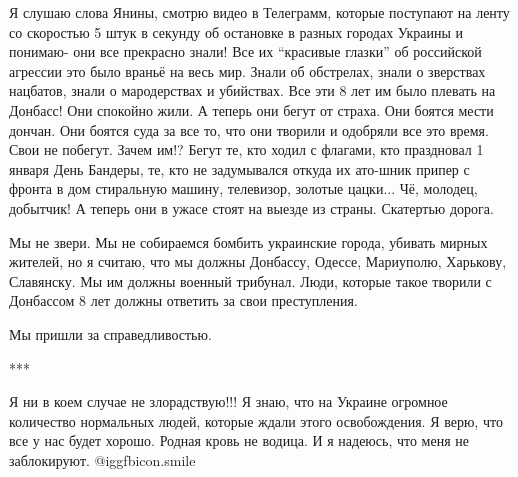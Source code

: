 Я слушаю слова Янины, смотрю видео в Телеграмм, которые поступают на ленту со
скоростью 5 штук в секунду об остановке в разных городах Украины и понимаю- они
все прекрасно знали! Все их \enquote{красивые глазки} об российской агрессии это было
враньё на весь мир. Знали об обстрелах, знали о зверствах нацбатов, знали о
мародерствах и убийствах. Все эти 8 лет им было плевать на Донбасс! Они
спокойно жили. А теперь они бегут от страха. Они боятся мести дончан. Они
боятся суда за все то, что они творили и одобряли все это время. Свои не
побегут. Зачем им!? Бегут те, кто ходил с флагами, кто праздновал 1 января День
Бандеры, те, кто не задумывался откуда их ато-шник припер с фронта в дом
стиральную машину, телевизор, золотые цацки... Чё, молодец, добытчик! А теперь
они в ужасе стоят на выезде из страны. Скатертью дорога.

Мы не звери. Мы не собираемся бомбить украинские города, убивать мирных
жителей, но я считаю, что мы должны Донбассу, Одессе, Мариуполю, Харькову,
Славянску. Мы им должны военный трибунал. Люди, которые такое творили с
Донбассом 8 лет должны ответить за свои преступления.

Мы пришли за справедливостью.

***

Я ни в коем случае не злорадствую!!! Я знаю, что на Украине огромное количество
нормальных людей, которые ждали этого освобождения. Я верю, что все у нас будет
хорошо. Родная кровь не водица. И я надеюсь, что меня не заблокируют. @igg{fbicon.smile} 
